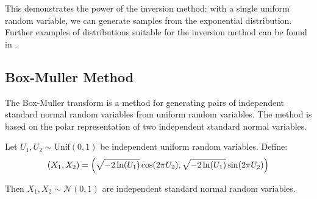 This demonstrates the power of the inversion method: with a single uniform random variable, we can generate samples from the exponential distribution. Further examples of distributions suitable for the inversion method can be found in \cite{owen_monte_2013}.

\subsection{Box-Muller Method}
\label{box-muller}
The Box-Muller transform is a method for generating pairs of independent standard normal random variables from uniform random variables. The method is based on the polar representation of two independent standard normal variables.

\begin{theoremrep}
\label{thm:box-muller}
Let $U_1, U_2 \sim \text{Unif}(0,1)$ be independent uniform random variables. Define:
\begin{equation}
    (X_1, X_2) = \Bigl(\sqrt{-2\ln(U_1)} \cos(2\pi U_2), \sqrt{-2\ln(U_1)} \sin(2\pi U_2)\Bigr)
\end{equation}

Then $X_1, X_2 \sim \mathcal{N}(0,1)$ are independent standard normal random variables.
\end{theoremrep}

